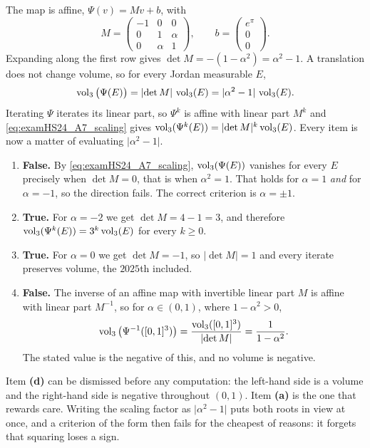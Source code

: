 \begin{exercisesolution}
\label{sol:affine_volume_scaling_tf}
The map is affine, $\Psi(v) = Mv + b$, with
\[M = \begin{pmatrix} -1 & 0 & 0 \\ 0 & 1 & \alpha \\ 0 & \alpha & 1 \end{pmatrix},
  \qquad b = \begin{pmatrix} e^\pi \\ 0 \\ 0 \end{pmatrix} .\]
Expanding along the first row gives $\det M = -(1 - \alpha^2) = \alpha^2 - 1$. A translation does
not change volume, so for every Jordan measurable $E$,
\begin{equation}
\label{eq:examHS24_A7_scaling}
\operatorname{vol}_3\big(\Psi(E)\big) = \lvert\det M\rvert \, \operatorname{vol}_3(E)
  = \lvert\alpha^2 - 1\rvert \, \operatorname{vol}_3(E) .
\end{equation}
Iterating $\Psi$ iterates its linear part, so $\Psi^k$ is affine with linear part $M^k$ and
\eqref{eq:examHS24_A7_scaling} gives $\operatorname{vol}_3(\Psi^k(E)) = \lvert\det M\rvert^k \operatorname{vol}_3(E)$. Every
item is now a matter of evaluating $\lvert\alpha^2-1\rvert$.
\begin{enumerate}[label=\textbf{(\alph*)}]
  \item \textbf{False.} By \eqref{eq:examHS24_A7_scaling}, $\operatorname{vol}_3(\Psi(E))$ vanishes for every $E$
    precisely when $\det M = 0$, that is when $\alpha^2 = 1$. That holds for $\alpha = 1$
    \emph{and} for $\alpha = -1$, so the  direction fails. The correct criterion is
    $\alpha = \pm 1$.
  \item \textbf{True.} For $\alpha = -2$ we get $\det M = 4 - 1 = 3$, and therefore
    $\operatorname{vol}_3(\Psi^k(E)) = 3^k \operatorname{vol}_3(E)$ for every $k \ge 0$.
  \item \textbf{True.} For $\alpha = 0$ we get $\det M = -1$, so $\lvert\det M\rvert = 1$ and every
    iterate preserves volume, the $2025$th included.
  \item \textbf{False.} The inverse of an affine map with invertible linear part $M$ is affine with
    linear part $M^{-1}$, so for $\alpha \in (0,1)$, where $1 - \alpha^2 > 0$,
    \[\operatorname{vol}_3\big(\Psi^{-1}([0,1]^3)\big) = \frac{\operatorname{vol}_3([0,1]^3)}{\lvert\det M\rvert}
      = \frac{1}{1-\alpha^2} .\]
    The stated value is the negative of this, and no volume is negative.
\end{enumerate}
\begin{remark}
Item \textbf{(d)} can be dismissed before any computation: the left-hand side is a volume and the
right-hand side is negative throughout $(0,1)$. Item \textbf{(a)} is the one that rewards care.
Writing the scaling factor as $\lvert\alpha^2-1\rvert$ puts both roots in view at once, and a
criterion of the form  then fails for the cheapest of reasons: it
forgets that squaring loses a sign.
\end{remark}
\end{exercisesolution}


